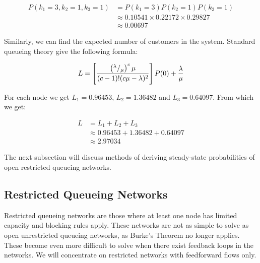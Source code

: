 \documentclass{article}
\begin{document}
\begin{equation*}
    \begin{split}
    P( k_1 = 3, k_2 = 1, k_3 = 1 ) & = P(k_1 = 3) P(k_2 = 1) P(k_3 = 1) \\
    & \approx 0.10541 \times 0.22172 \times 0.29827 \\
    & \approx 0.00697
    \end{split}
\end{equation*}

Similarly, we can find the expected number of customers in the system. Standard queueing theory give the following formula:

\begin{equation}
    L = \left[ { \left( ^\lambda / _\mu \right)^c \mu \over (c - 1)! (c \mu - \lambda)^2 } \right] P(0) + \frac{\lambda}{\mu}
\end{equation}

For each node we get $L_1 = 0.96453$, $L_2 = 1.36482$ and $L_3 = 0.64097$.
From which we get:

\begin{equation*}
    \begin{split}
    L & = L_1 + L_2 + L_3\\
    & \approx 0.96453 + 1.36482 + 0.64097 \\
    & \approx 2.97034
    \end{split}
\end{equation*}

The next subsection will discuss methods of deriving steady-state probabilities of open restricted queueing networks.

\subsection{Restricted Queueing Networks}

Restricted queueing networks are those where at least one node has limited capacity and blocking rules apply.
These networks are not as simple to solve as open unrestricted queueing networks, as Burke's Theorem no longer applies.
These become even more difficult to solve when there exist feedback loops in the networks.
We will concentrate on restricted networks with feedforward flows only.
\end{document}
